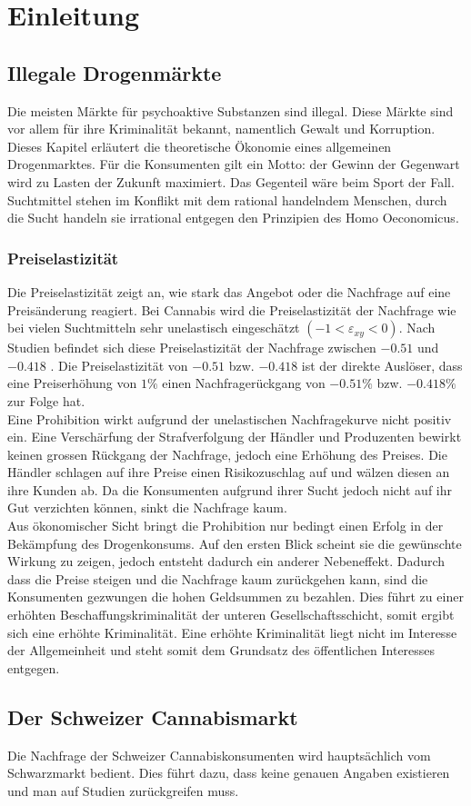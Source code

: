 \documentclass[../main.tex]{subfiles}
\begin{document}
	 \section{Einleitung}
	 
	 \subsection{Illegale Drogenmärkte}
	 Die meisten Märkte für psychoaktive Substanzen sind illegal.
	 Diese Märkte sind vor allem für ihre Kriminalität bekannt, namentlich Gewalt und Korruption. 
	 Dieses Kapitel erläutert die theoretische Ökonomie eines allgemeinen Drogenmarktes.
	 Für die Konsumenten gilt ein Motto: der Gewinn der Gegenwart wird zu Lasten der Zukunft maximiert. 
	 Das Gegenteil wäre beim Sport der Fall. Suchtmittel stehen im Konflikt mit dem rational handelndem Menschen, 
	 durch die Sucht handeln sie irrational entgegen den Prinzipien des Homo Oeconomicus.

	\subsubsection{Preiselastizität}
	Die Preiselastizität zeigt an, wie stark das Angebot oder die Nachfrage auf eine Preisänderung reagiert.
	Bei Cannabis wird die Preiselastizität der Nachfrage wie bei vielen Suchtmitteln sehr unelastisch eingeschätzt $(-1<\varepsilon_{xy}<0)$. 
	Nach Studien befindet sich diese Preiselastizität der Nachfrage zwischen $-0.51$ \cite{golzar} und $-0.418$ \cite{halcoussis}.
	Die Preiselastizität von $-0.51$ bzw. $-0.418$ ist der direkte Auslöser, dass eine Preiserhöhung von $1\%$ einen Nachfragerückgang von $-0.51\%$ bzw. $-0.418\%$ zur Folge hat.\\
	
	\noindent
	Eine Prohibition wirkt aufgrund der unelastischen Nachfragekurve nicht positiv ein.
	Eine Verschärfung der Strafverfolgung der Händler und Produzenten bewirkt keinen grossen Rückgang der Nachfrage, jedoch eine Erhöhung des Preises.
	Die Händler schlagen auf ihre Preise einen Risikozuschlag auf und wälzen diesen an ihre Kunden ab.
	Da die Konsumenten aufgrund ihrer Sucht jedoch nicht auf ihr Gut verzichten können, sinkt die Nachfrage kaum. \\
	
	\noindent
	Aus ökonomischer Sicht bringt die Prohibition nur bedingt einen Erfolg in der Bekämpfung des Drogenkonsums. 
	Auf den ersten Blick scheint sie die gewünschte Wirkung zu zeigen, jedoch entsteht dadurch ein anderer Nebeneffekt. 
	Dadurch dass die Preise steigen und die Nachfrage kaum zurückgehen kann, sind die Konsumenten gezwungen die hohen Geldsummen zu bezahlen. 
	Dies führt zu einer erhöhten Beschaffungskriminalität der unteren Gesellschaftsschicht, somit ergibt sich eine erhöhte Kriminalität. 
	Eine erhöhte Kriminalität liegt nicht im Interesse der Allgemeinheit und steht somit dem Grundsatz des öffentlichen Interesses entgegen.
	
	\subsection{Der Schweizer Cannabismarkt}
	Die Nachfrage der Schweizer Cannabiskonsumenten wird hauptsächlich vom Schwarzmarkt bedient. 
	Dies führt dazu, dass keine genauen Angaben existieren und man auf Studien zurückgreifen muss.
	
	
	
\end{document}
